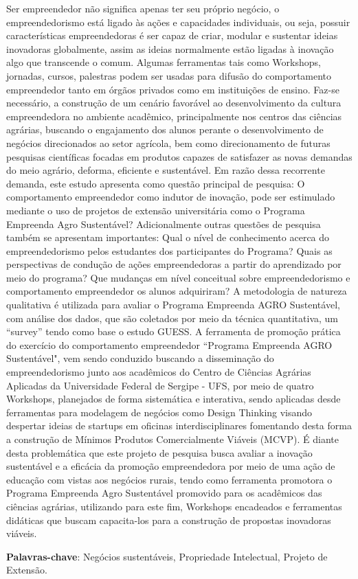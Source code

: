 \setlength{\absparsep}{18pt} %
\begin{resumo}


Ser empreendedor não significa apenas ter seu próprio negócio, o empreendedorismo está ligado às ações e capacidades individuais, ou seja, possuir características empreendedoras é ser capaz de criar, modular e sustentar ideias inovadoras globalmente, assim as ideias normalmente estão ligadas à inovação algo que transcende o comum. Algumas ferramentas tais como Workshops, jornadas, cursos, palestras podem ser usadas para difusão do comportamento empreendedor tanto em órgãos privados como em instituições de ensino. Faz-se necessário, a construção de um cenário favorável ao desenvolvimento da cultura empreendedora no ambiente acadêmico, principalmente nos centros das ciências agrárias, buscando o engajamento dos alunos perante o desenvolvimento de negócios direcionados ao setor agrícola, bem como direcionamento de futuras pesquisas científicas focadas em produtos capazes de satisfazer as novas demandas do meio agrário, deforma, eficiente e sustentável. Em razão dessa recorrente demanda, este estudo apresenta como questão principal de pesquisa: O comportamento empreendedor como indutor de inovação, pode ser estimulado mediante o uso de projetos de extensão universitária como o Programa Empreenda Agro Sustentável? Adicionalmente outras questões de pesquisa também se apresentam importantes: Qual o nível de conhecimento acerca do empreendedorismo pelos estudantes dos participantes do Programa? Quais as perspectivas de condução de ações empreendedoras a partir do aprendizado por meio do programa? Que mudanças em nível conceitual sobre empreendedorismo e comportamento empreendedor os alunos adquiriram? A metodologia de natureza qualitativa é utilizada para avaliar o Programa Empreenda AGRO Sustentável, com análise dos dados, que são coletados por meio da técnica quantitativa, um “survey” tendo como base o estudo GUESS. A ferramenta de promoção prática do exercício do comportamento empreendedor  “Programa Empreenda AGRO Sustentável", vem sendo conduzido buscando a disseminação do empreendedorismo junto aos acadêmicos do Centro de Ciências Agrárias Aplicadas da Universidade Federal de Sergipe - UFS, por meio de quatro Workshops, planejados de forma sistemática e interativa, sendo aplicadas desde ferramentas para modelagem de negócios como Design Thinking visando despertar ideias de startups em oficinas interdisciplinares fomentando desta forma a construção de Mínimos Produtos Comercialmente Viáveis (MCVP). É diante desta problemática que este projeto de pesquisa busca avaliar a inovação sustentável e a eficácia da promoção empreendedora por meio de uma ação de educação com vistas aos negócios rurais, tendo como ferramenta promotora o Programa Empreenda Agro Sustentável promovido para os acadêmicos das ciências agrárias, utilizando para este fim, Workshops encadeados e ferramentas didáticas que buscam capacita-los para a construção de propostas inovadoras viáveis.


 \textbf{Palavras-chave}: Negócios sustentáveis, Propriedade Intelectual, Projeto de Extensão.
\end{resumo}